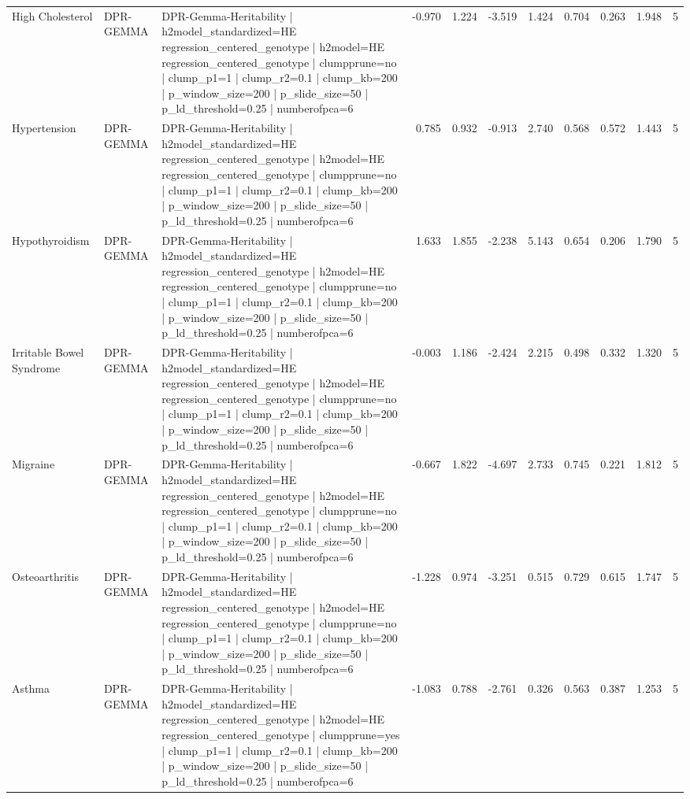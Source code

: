 \begin{landscape}
\begin{longtable}{p{2.4cm}p{1.8cm}p{6.0cm}rrrrrrrr}
High Cholesterol & DPR-GEMMA & DPR-Gemma-Heritability | h2model\_standardized=HE regression\_centered\_genotype | h2model=HE regression\_centered\_genotype | clumpprune=no | clump\_p1=1 | clump\_r2=0.1 | clump\_kb=200 | p\_window\_size=200 | p\_slide\_size=50 | p\_ld\_threshold=0.25 | numberofpca=6 & -0.970 & 1.224 & -3.519 & 1.424 & 0.704 & 0.263 & 1.948 & 5 \\
Hypertension & DPR-GEMMA & DPR-Gemma-Heritability | h2model\_standardized=HE regression\_centered\_genotype | h2model=HE regression\_centered\_genotype | clumpprune=no | clump\_p1=1 | clump\_r2=0.1 | clump\_kb=200 | p\_window\_size=200 | p\_slide\_size=50 | p\_ld\_threshold=0.25 | numberofpca=6 & 0.785 & 0.932 & -0.913 & 2.740 & 0.568 & 0.572 & 1.443 & 5 \\
Hypothyroidism & DPR-GEMMA & DPR-Gemma-Heritability | h2model\_standardized=HE regression\_centered\_genotype | h2model=HE regression\_centered\_genotype | clumpprune=no | clump\_p1=1 | clump\_r2=0.1 | clump\_kb=200 | p\_window\_size=200 | p\_slide\_size=50 | p\_ld\_threshold=0.25 | numberofpca=6 & 1.633 & 1.855 & -2.238 & 5.143 & 0.654 & 0.206 & 1.790 & 5 \\
Irritable Bowel Syndrome & DPR-GEMMA & DPR-Gemma-Heritability | h2model\_standardized=HE regression\_centered\_genotype | h2model=HE regression\_centered\_genotype | clumpprune=no | clump\_p1=1 | clump\_r2=0.1 | clump\_kb=200 | p\_window\_size=200 | p\_slide\_size=50 | p\_ld\_threshold=0.25 | numberofpca=6 & -0.003 & 1.186 & -2.424 & 2.215 & 0.498 & 0.332 & 1.320 & 5 \\
Migraine & DPR-GEMMA & DPR-Gemma-Heritability | h2model\_standardized=HE regression\_centered\_genotype | h2model=HE regression\_centered\_genotype | clumpprune=no | clump\_p1=1 | clump\_r2=0.1 | clump\_kb=200 | p\_window\_size=200 | p\_slide\_size=50 | p\_ld\_threshold=0.25 | numberofpca=6 & -0.667 & 1.822 & -4.697 & 2.733 & 0.745 & 0.221 & 1.812 & 5 \\
Osteoarthritis & DPR-GEMMA & DPR-Gemma-Heritability | h2model\_standardized=HE regression\_centered\_genotype | h2model=HE regression\_centered\_genotype | clumpprune=no | clump\_p1=1 | clump\_r2=0.1 | clump\_kb=200 | p\_window\_size=200 | p\_slide\_size=50 | p\_ld\_threshold=0.25 | numberofpca=6 & -1.228 & 0.974 & -3.251 & 0.515 & 0.729 & 0.615 & 1.747 & 5 \\
Asthma & DPR-GEMMA & DPR-Gemma-Heritability | h2model\_standardized=HE regression\_centered\_genotype | h2model=HE regression\_centered\_genotype | clumpprune=yes | clump\_p1=1 | clump\_r2=0.1 | clump\_kb=200 | p\_window\_size=200 | p\_slide\_size=50 | p\_ld\_threshold=0.25 | numberofpca=6 & -1.083 & 0.788 & -2.761 & 0.326 & 0.563 & 0.387 & 1.253 & 5 \\

\end{longtable}
\end{landscape}
